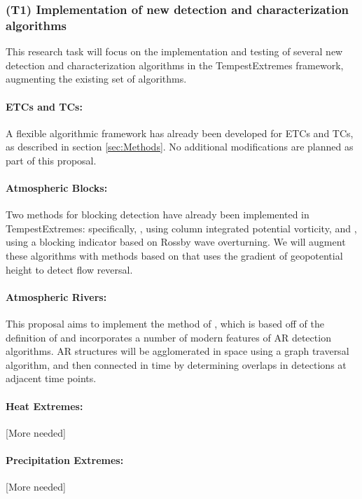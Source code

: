 \documentclass[11pt]{article}
\begin{document}
\subsubsection{(T1) Implementation of new detection and characterization algorithms}

This research task will focus on the implementation and testing of several new detection and characterization algorithms in the TempestExtremes framework, augmenting the existing set of  algorithms.

\paragraph{ETCs and TCs:}  A flexible algorithmic framework has already been developed for ETCs and TCs, as described in section \ref{sec:Methods}.  No additional modifications are planned as part of this proposal.

\paragraph{Atmospheric Blocks:}  Two methods for blocking detection have already been implemented in TempestExtremes:  specifically, \cite{schwierz2004perspicacious}, using column integrated potential vorticity, and \cite{pelly2003new}, using a blocking indicator based on Rossby wave overturning.  We will augment these algorithms with methods based on \cite{tibaldi1990operational} that uses the gradient of geopotential height to detect flow reversal.

\paragraph{Atmospheric Rivers:}  This proposal aims to implement the method of \cite{jiang2014intermediate}, which is based off of the definition of \cite{ralph2004satellite} and incorporates a number of modern features of AR detection algorithms.  AR structures will be agglomerated in space using a graph traversal algorithm, and then connected in time by determining overlaps in detections at adjacent time points.

\paragraph{Heat Extremes:}  {\color{red} [More needed]}

\paragraph{Precipitation Extremes:}  {\color{red} [More needed]}
\end{document}
